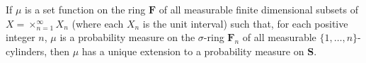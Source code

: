 If $\mu$ is a set function on the ring $\mathbf{F}$ of all measurable finite dimensional subsets of $X = \times_{n=1}^{\infty} X_n$ (where each $X_n$ is the unit interval) such that, for each positive integer $n$, $\mu$ is a probability measure on the $\sigma$-ring $\mathbf{F}_n$ of all measurable $\{1,\ldots,n\}$-cylinders, then $\mu$ has a unique extension to a probability measure on $\mathbf{S}$.
